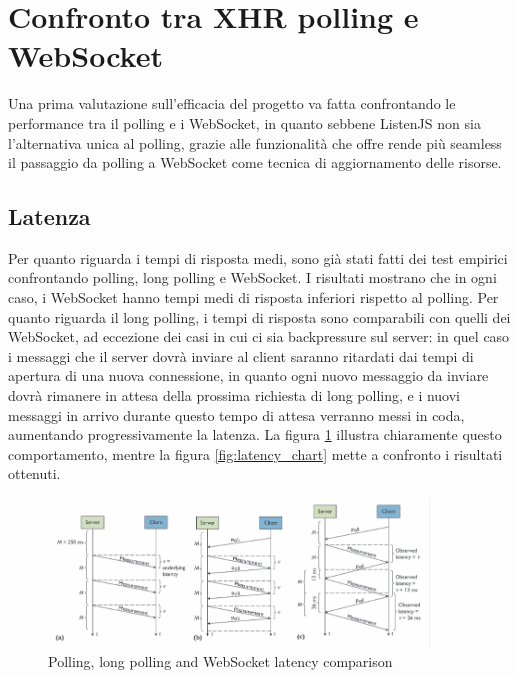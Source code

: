 \documentclass[12pt,a4paper,openright,twoside]{report}
\begin{document}
\section{Confronto tra XHR polling e WebSocket}\label{sec_confrontopollingwebsockets}

Una prima valutazione sull'efficacia del progetto va fatta confrontando le performance tra il polling e i WebSocket, in quanto sebbene ListenJS non sia l'alternativa unica al polling, grazie alle funzionalità che offre rende più seamless il passaggio da polling a WebSocket come tecnica di aggiornamento delle risorse.

\subsection{Latenza}
Per quanto riguarda i tempi di risposta medi, sono già stati fatti dei test empirici confrontando polling, long polling e WebSocket\cite{communicating_websocket}. I risultati mostrano che in ogni caso, i WebSocket hanno tempi medi di risposta inferiori rispetto al polling. Per quanto riguarda il long polling, i tempi di risposta sono comparabili con quelli dei WebSocket, ad eccezione dei casi in cui ci sia backpressure\cite{backpressure} sul server: in quel caso i messaggi che il server dovrà inviare al client saranno ritardati dai tempi di apertura di una nuova connessione, in quanto ogni nuovo messaggio da inviare dovrà rimanere in attesa della prossima richiesta di long polling, e i nuovi messaggi in arrivo durante questo tempo di attesa verranno messi in coda, aumentando progressivamente la latenza. La figura \ref{fig:latency} illustra chiaramente questo comportamento, mentre la figura \ref{fig:latency_chart} mette a confronto i risultati ottenuti.

\begin{figure}[htbp]
\centering
\includegraphics[width=0.9\textwidth]{assets/latency.png}
\caption{Polling, long polling and WebSocket latency comparison}
\label{fig:latency}
\end{figure}
\end{document}
